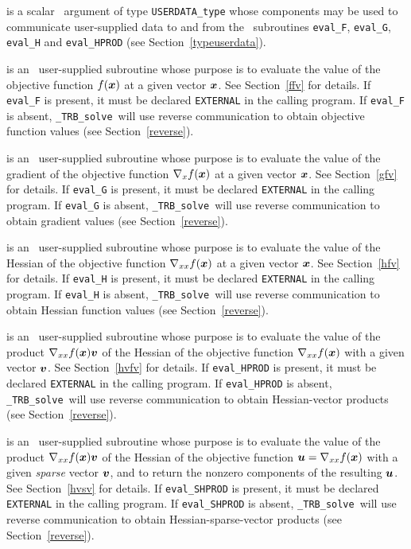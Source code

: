 \documentclass{galahad}
\newcommand{\packagename}{TRB}
\newcommand{\fullpackagename}{\libraryname\_\packagename}
\newcommand{\solver}{{\tt \fullpackagename\_solve}}
\begin{document}
\begin{description}
 is a scalar \intentinout\ argument of type
{\tt USERDATA\_type} whose components may be used
to communicate user-supplied data to and from the
\optional\ subroutines
{\tt eval\_F}, {\tt eval\_G},
{\tt eval\_H} and {\tt eval\_HPROD}
(see Section~\ref{typeuserdata}).

 is an \optional\
user-supplied subroutine whose purpose is to evaluate the value of the
objective function $f({\bm{x}})$ at a given vector ${\bm{x}}$.
See Section~\ref{ffv} for details.
If {\tt eval\_F} is present,
it must be declared {\tt EXTERNAL} in the calling program.
If {\tt eval\_F} is absent, \solver\ will use reverse communication to
obtain objective function values (see Section~\ref{reverse}).

 is an \optional\
user-supplied subroutine whose purpose is to evaluate the value of the
gradient of the objective function $\nabla_x f({\bm{x}})$ at a given vector ${\bm{x}}$.
See Section~\ref{gfv} for details.
If {\tt eval\_G} is present,
it must be declared {\tt EXTERNAL} in the calling program.
If {\tt eval\_G} is absent, \solver\ will use reverse communication to
obtain gradient values (see Section~\ref{reverse}).

 is an \optional\
user-supplied subroutine whose purpose is to evaluate the value of the
Hessian of the objective function $\nabla_{xx} f({\bm{x}})$ at a given vector ${\bm{x}}$.
See Section~\ref{hfv} for details.
If {\tt eval\_H} is present,
it must be declared {\tt EXTERNAL} in the calling program.
If {\tt eval\_H} is absent, \solver\ will use reverse communication to
obtain Hessian function values (see Section~\ref{reverse}).

\itt{eval\_HPROD} is an \optional\
user-supplied subroutine whose purpose is to evaluate the value of the
product $\nabla_{xx} f({\bm{x}}){\bm{v}}$ of the Hessian of the objective function
$\nabla_{xx} f({\bm{x}})$  with a given vector ${\bm{v}}$.
See Section~\ref{hvfv} for details.
If {\tt eval\_HPROD} is present,
it must be declared {\tt EXTERNAL} in the calling program.
If {\tt eval\_HPROD} is absent, \solver\ will use reverse communication to
obtain Hessian-vector products (see Section~\ref{reverse}).

\itt{eval\_SHPROD} is an \optional\
user-supplied subroutine whose purpose is to evaluate the value of the
product $\nabla_{xx} f({\bm{x}}){\bm{v}}$ of the Hessian of the objective function
${\bm{u}} = \nabla_{xx} f({\bm{x}})$  with a given {\em sparse} vector ${\bm{v}}$,
and to return the nonzero components of the resulting ${\bm{u}}$.
See Section~\ref{hvsv} for details.
If {\tt eval\_SHPROD} is present,
it must be declared {\tt EXTERNAL} in the calling program.
If {\tt eval\_SHPROD} is absent, \solver\ will use reverse communication to
obtain Hessian-sparse-vector products (see Section~\ref{reverse}).


\end{description}
\end{document}
